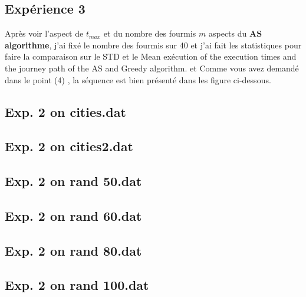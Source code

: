 
\subsection{Expérience 3}
Après voir l'aspect de $ t_{max} $ et du nombre des fourmis $ m $ aspects du \textbf{AS algorithme}, j'ai fixé le nombre des fourmis sur 40 et j'ai fait les statistiques pour faire la comparaison sur le STD et le Mean exécution of the execution times and the journey path of the AS and Greedy algorithm.
et Comme vous avez demandé dans le point (4) , la séquence est bien présenté dans les figure ci-dessous.
\subsection*{ \centering Exp. 2 on cities.dat }



\subsection*{ \centering Exp. 2 on cities2.dat }


\subsection*{ \centering Exp. 2 on rand 50.dat}


\subsection*{ \centering Exp. 2 on rand 60.dat}
\comm{}



\subsection*{ \centering Exp. 2 on rand 80.dat}


\subsection*{ \centering Exp. 2 on rand 100.dat}

